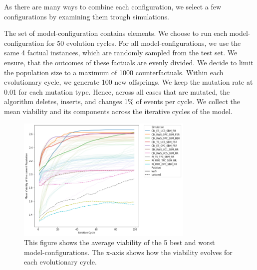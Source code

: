 \documentclass[./../../paper.tex]{subfiles}
\begin{document}
\label{sec:exp1}
As there are many ways to combine each configuration, we select a few configurations by examining them trough simulations.  



The set of model-configuration contains \NumEvoCombinations elements. 
We choose to run each model-configuration for 50 evolution cycles. 
For all model-configurations, we use the same 4 factual \glspl{instance}, which are randomly sampled from the test set. We ensure, that the outcomes of these factuals are evenly divided. 
We decide to limit the population size to a maximum of 1000 counterfactuals. Within each evolutionary cycle, we generate 100 new offsprings. We keep the mutation rate at 0.01 for each mutation type. Hence, across all cases that are mutated, the algorithm deletes, inserts, and changes 1\% of events per cycle. We collect the mean viability and its components across the iterative cycles of the model.



\begin{figure}[htbp]
    \centering
    \includegraphics[width=0.75\textwidth]{figures/generated/exp1_effect_on_viability_top10_last10.png}
    \caption{This figure shows the average viability of the 5 best and worst model-configurations. The x-axis shows how the viability evolves for each evolutionary cycle.}
    \label{fig:average-viability}
\end{figure}
\end{document}
